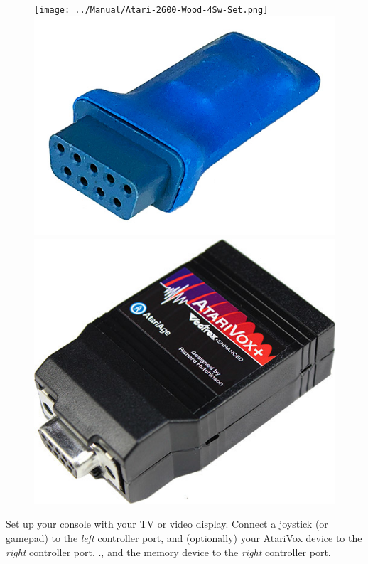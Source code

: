 \documentclass[10pt,twocolumn,openany,article]{memoir}
\begin{document}
\ifdefined\ATARIAGESAVE\else
\ifdefined\NOSAVE\else
\begin{figure}[b]
  \begin{center}
    \ifdefined\ATARIAGESAVE
    \texttt{[image: ../Manual/Atari-2600-Wood-4Sw-Set.png]}
    \else
    \includegraphics[width=\columnwidth]{../Manual/SaveKey.jpeg}
    \fi
    \includegraphics[width=\columnwidth]{../Manual/AtariVox.jpeg}
  \end{center}
\end{figure}
\fi
\fi

Set up  your console with your  TV or video display.  Connect a joystick
(or gamepad) to  the \emph{left} controller port\ifdefined\ATARIAGESAVE,
and  (optionally) your  AtariVox device  to the  \emph{right} controller
port.  \else\ifdefined\NOSAVE.\else{},  and  the memory  device  to  the
\emph{right} controller port.
\end{document}
